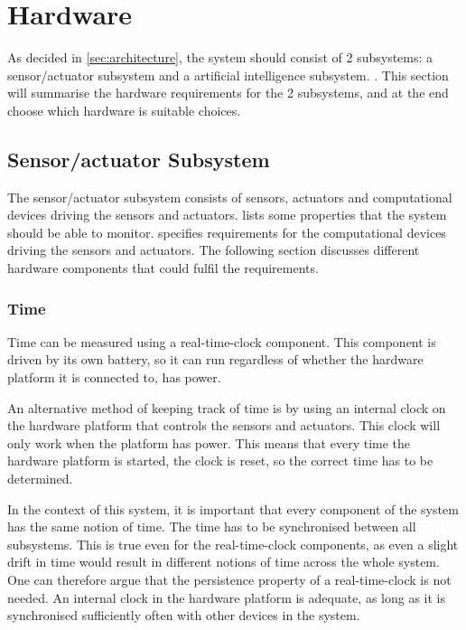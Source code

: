 \section{Hardware}
As decided in \cref{sec:architecture}, the system should consist of 2 subsystems: a sensor/actuator subsystem and a artificial intelligence subsystem. . This section will summarise the hardware requirements for the 2 subsystems, and at the end choose which hardware is suitable choices.

\subsection{Sensor/actuator Subsystem}
The sensor/actuator subsystem consists of sensors, actuators and computational devices driving the sensors and actuators.  lists some properties that the system should be able to monitor.  specifies requirements for the computational devices driving the sensors and actuators. The following section discusses different hardware components that could fulfil the requirements. 

\subsubsection{Time}
Time can be measured using a real-time-clock component. This component is driven by its own battery, so it can run regardless of whether the hardware platform it is connected to, has power.

An alternative method of keeping track of time is by using an internal clock on the hardware platform that controls the sensors and actuators. This clock will only work when the platform has power. This means that every time the hardware platform is started, the clock is reset, so the correct time has to be determined.

In the context of this system, it is important that every component of the system has the same notion of time. The time has to be synchronised between all subsystems. This is true even for the real-time-clock components, as even a slight drift in time would result in different notions of time across the whole system. One can therefore argue that the persistence property of a real-time-clock is not needed. An internal clock in the hardware platform is adequate, as long as it is synchronised sufficiently often with other devices in the system.

